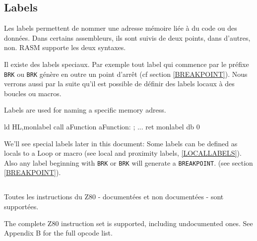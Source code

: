 \subsection{Labels}
\begin{xfr}
Les labels permettent de nommer une adresse mémoire liée à du code ou des données.
Dans certains assembleurs, ils sont suivis de deux points, dans d'autres, non. RASM supporte les deux syntaxes.

Il existe des labels speciaux. Par exemple tout label qui commence par le préfixe \texttt{BRK} ou \texttt{\at BRK} génère en outre un point d'arrêt (cf section \ref{BREAKPOINT}). Nous verrons aussi par la suite qu'il est possible de définir des labels locaux à des boucles ou macros.
\end{xfr}

\begin{xen}
Labels are used for naming a specific memory adress.
\end{xen}

\begin{code}
 ld HL,monlabel
 call aFunction
aFunction:
; ...
 ret
monlabel db 0
\end{code}

\begin{xen}
We'll see special labels later in this document: Some labels can be defined as locals to a Loop or macro (see local and proximity labels, \ref{LOCALLABELS}).
Also any label beginning with \texttt{BRK} or \texttt{\at BRK} will generate a \texttt{BREAKPOINT}. (see section \ref{BREAKPOINT}).
\end{xen}


\subsection{}

\begin{xfr}
Toutes les instructions du Z80 - documentées et non documentées - sont supportées.
\end{xfr}

\begin{xen}
The complete Z80 instruction set is supported, including undocumented ones.
See Appendix B for the full opcode list.
\end{xen}

\subsubsection{}

